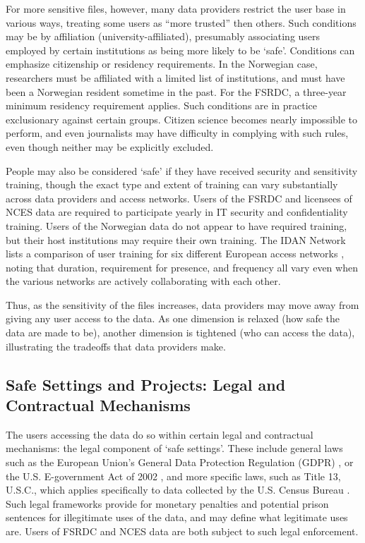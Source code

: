 For more sensitive files, however, many data providers restrict the user base in various ways, treating some users as ``more trusted'' then others. Such conditions may be by affiliation (university-affiliated), presumably associating users employed  by certain institutions as being more likely to be `safe'. Conditions can emphasize citizenship or residency requirements. In the Norwegian case, researchers must be affiliated with a limited list of institutions, and must have been a Norwegian resident sometime in the past. For the FSRDC, a three-year minimum residency requirement applies. Such conditions are in practice exclusionary against certain groups. Citizen science becomes nearly impossible to perform, and even journalists may have difficulty in complying with such rules, even though neither may be explicitly excluded. 

People may also be considered `safe' if they have received security and sensitivity training, though the exact type and extent of training can vary substantially across data providers and access networks. Users of the FSRDC and licensees of NCES data are required to participate yearly in IT security and confidentiality training. Users of the Norwegian data do not appear to have required training, but their host institutions may require their own training. The IDAN Network lists a comparison of user training for six different European access networks \cite{idan_network_idan_nodate}, noting that duration, requirement for presence, and frequency all vary even when the various networks are actively collaborating with each other. 

Thus, as the sensitivity of the files increases, data providers may move away from giving any user access to the data. As one dimension is relaxed (how safe the data are made to be), another dimension is tightened (who can access the data), illustrating the tradeoffs that data providers make. 

\subsection{Safe Settings and Projects: Legal and Contractual Mechanisms}

The users accessing the data do so within certain legal and contractual mechanisms: the legal component of `safe settings'. These include general laws such as the European Union's General Data Protection Regulation (GDPR) \cite{noauthor_general_2016}, or the U.S. E-government Act of 2002 \cite{noauthor_e-government_2002}, and more specific laws, such as Title 13, U.S.C., which applies specifically to data collected by the U.S. Census Bureau \cite{noauthor_title_nodate,us_census_bureau_federal_2021}. Such legal frameworks provide for monetary penalties and potential prison sentences for illegitimate uses of the data, and may define what legitimate uses are. Users of FSRDC and NCES data are both subject to such legal enforcement.

